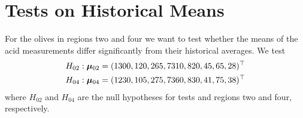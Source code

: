 \section{Tests on Historical Means}

For the olives in regions two and four we want to test whether the means of the acid measurements differ significantly from their historical averages. We test 
\begin{eqnarray*}
H_{02}:\mathbf{\bm{\mu}}_{02}=(1300,120,265,7310,820,45,65,28)^\top \\
H_{04}:\mathbf{\bm{\mu}}_{04}=(1230,105,275,7360,830,41,75,38)^\top
\end{eqnarray*}
\noindent where $H_{02}$ and $H_{04}$ are the null hypotheses for tests and regions two and four, respectively.


